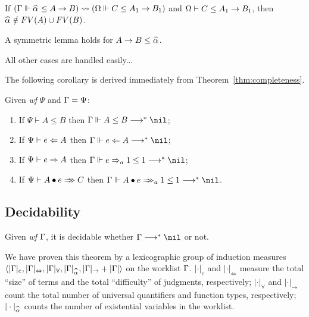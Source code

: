 \begin{lemma}
If $(\Gm \Vdash \al \le A \to B) \sto (\Om \Vdash C \le A_1 \to B_1)$ and
$\Omega \vdash C \le A_1 \to B_1$, then $\al\notin FV(A) \cup FV(B)$.
\end{lemma}
A symmetric lemma holds for $A\to B \le \al$.

All other cases are handled easily... 

The following corollary is derived immediately from Theorem~\ref{thm:completeness}.
\begin{corollary}
Given \emph{wf }$\Psi$ and $\Gamma = \Psi$:
\begin{enumerate}
    \item If $\Psi \vdash A \le B$ then $\Gm \Vdash A \le B \redto \nil$;
    \item If $\Psi \vdash e \Leftarrow A$ then $\Gm \Vdash e \Lto A \redto \nil$;
    \item If $\Psi \vdash e \Rightarrow A$ then $\Gm \Vdash e \To_a 1 \le 1 \redto \nil$;
    \item If $\Psi \vdash \appInf{A}{e}{C}$ then $\Gm \Vdash \appInfAlg{A}{e}[a][1 \le 1] \redto \nil$.
\end{enumerate}
\end{corollary}

\subsection{Decidability}
\begin{theorem}[Decidability]
Given \emph{wf }$\Gamma$, it is decidable whether $\Gm\redto\nil$ or not.
\end{theorem}

We have proven this theorem by a lexicographic group of induction measures\\
$\langle |\Gm|_e, |\Gm|_\Leftrightarrow, |\Gm|_\forall, |\Gm|_{\al}, |\Gm|_\to + |\Gm| \rangle$
on the worklist $\Gamma$.
$|\cdot|_e$ and $|\cdot|_\Leftrightarrow$ measure the total ``size'' of terms
and the total ``difficulty'' of judgments, respectively;
$|\cdot|_\forall$ and $|\cdot|_\to$ count the total number of
universal quantifiers and function types, respectively;
$|\cdot|_{\al}$ counts the number of existential variables in the worklist.

